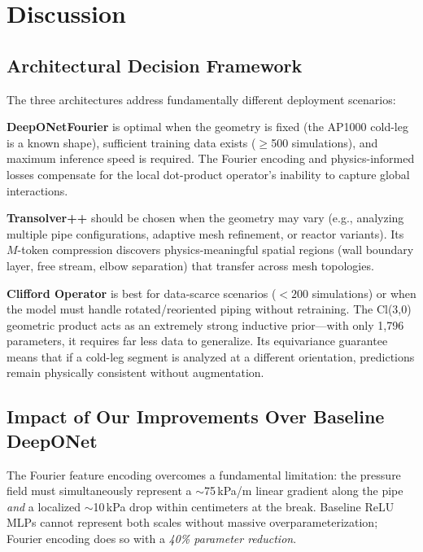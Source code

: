 \documentclass[conference]{IEEEtran}
\begin{document}
\section{Discussion}
\label{sec:discussion}

\subsection{Architectural Decision Framework}

The three architectures address fundamentally different deployment scenarios:

\textbf{DeepONetFourier} is optimal when the geometry is fixed (the AP1000 cold-leg is a known shape), sufficient training data exists ($\geq$500 simulations), and maximum inference speed is required. The Fourier encoding and physics-informed losses compensate for the local dot-product operator's inability to capture global interactions.

\textbf{Transolver++} should be chosen when the geometry may vary (e.g., analyzing multiple pipe configurations, adaptive mesh refinement, or reactor variants). Its $M$-token compression discovers physics-meaningful spatial regions (wall boundary layer, free stream, elbow separation) that transfer across mesh topologies.

\textbf{Clifford Operator} is best for data-scarce scenarios ($< 200$ simulations) or when the model must handle rotated/reoriented piping without retraining. The Cl(3,0) geometric product acts as an extremely strong inductive prior---with only 1,796 parameters, it requires far less data to generalize. Its equivariance guarantee means that if a cold-leg segment is analyzed at a different orientation, predictions remain physically consistent without augmentation.

\subsection{Impact of Our Improvements Over Baseline DeepONet}

The Fourier feature encoding overcomes a fundamental limitation: the pressure field must simultaneously represent a $\sim$75\,kPa/m linear gradient along the pipe \emph{and} a localized $\sim$10\,kPa drop within centimeters at the break. Baseline ReLU MLPs cannot represent both scales without massive overparameterization; Fourier encoding does so with a \emph{40\% parameter reduction}.
\end{document}
